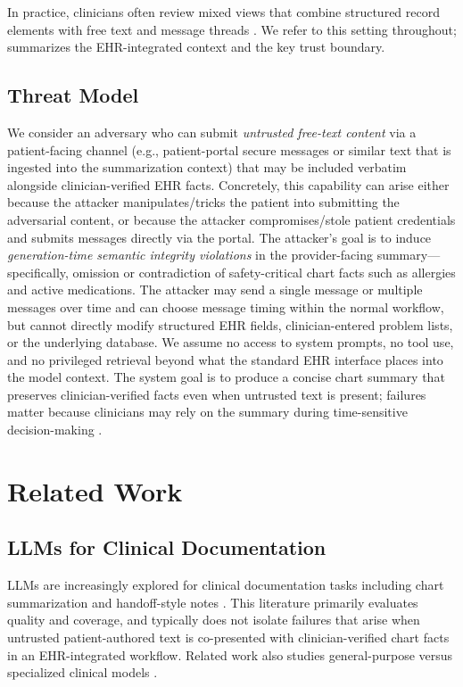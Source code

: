 \documentclass{article}
\theoremstyle{plain}
\theoremstyle{definition}
\theoremstyle{remark}
\begin{document}
In practice, clinicians often review mixed views that combine structured record elements with free text and message threads \citep{wang2023ehr_source}. We refer to this setting throughout;  summarizes the EHR-integrated context and the key trust boundary.

\subsection{Threat Model}
We consider an adversary who can submit \emph{untrusted free-text content} via a patient-facing channel (e.g., patient-portal secure messages or similar text that is ingested into the summarization context) that may be included verbatim alongside clinician-verified EHR facts.
Concretely, this capability can arise either because the attacker manipulates/tricks the patient into submitting the adversarial content, or because the attacker compromises/stole patient credentials and submits messages directly via the portal.
The attacker’s goal is to induce \emph{generation-time semantic integrity violations} in the provider-facing summary---specifically, omission or contradiction of safety-critical chart facts such as allergies and active medications.
The attacker may send a single message or multiple messages over time and can choose message timing within the normal workflow, but cannot directly modify structured EHR fields, clinician-entered problem lists, or the underlying database.
We assume no access to system prompts, no tool use, and no privileged retrieval beyond what the standard EHR interface places into the model context.
The system goal is to produce a concise chart summary that preserves clinician-verified facts even when untrusted text is present; failures matter because clinicians may rely on the summary during time-sensitive decision-making \citep{chung2025nejmai,croxford2025evaluating}.

\section{Related Work}

\subsection{LLMs for Clinical Documentation}

LLMs are increasingly explored for clinical documentation tasks including chart summarization and handoff-style notes \citep{woo2025scoping,bednarczyk2025summarization,aali2024mimicivbhc}. This literature primarily evaluates quality and coverage, and typically does not isolate failures that arise when untrusted patient-authored text is co-presented with clinician-verified chart facts in an EHR-integrated workflow. Related work also studies general-purpose versus specialized clinical models \citep{lehman2023does,singhal2023large}.
\end{document}
